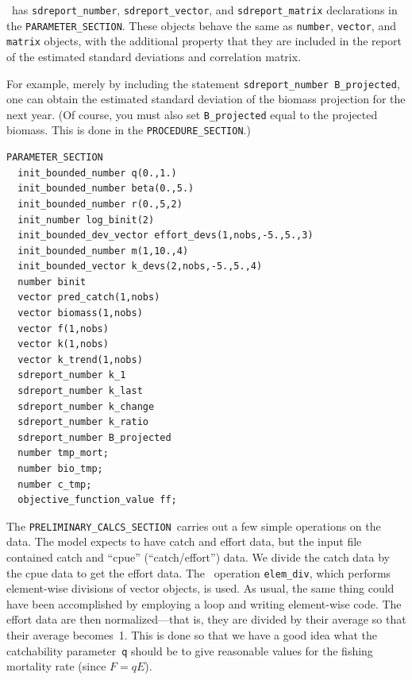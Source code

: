 \documentclass{admbmanual}
\newcommand\PS{\texttt{PARAMETER\_SECTION}}
\newcommand\PCS{\texttt{PRELIMINARY\_CALCS\_SECTION}}
\newcommand\PROS{\texttt{PROCEDURE\_SECTION}}
\begin{document}
\ADM\ has \texttt{sdreport\_number}, \texttt{sdreport\_vector},
and \texttt{sdreport\_matrix} declarations in the \PS.
 These objects behave the same as 
\texttt{number}, \texttt{vector}, and \texttt{matrix} objects,
with the additional property that they
are included in the report of the estimated standard
deviations and correlation matrix.

For example, merely by including the
statement \texttt{sdreport\_number B\_projected},
one can obtain the estimated standard deviation of
the biomass projection for the next year. 
(Of course, you must also set \texttt{B\_projected}
equal to the projected biomass. This is done in the \PROS.)
\begin{lstlisting}
PARAMETER_SECTION
  init_bounded_number q(0.,1.)
  init_bounded_number beta(0.,5.)
  init_bounded_number r(0.,5,2)
  init_number log_binit(2)
  init_bounded_dev_vector effort_devs(1,nobs,-5.,5.,3)
  init_bounded_number m(1,10.,4)
  init_bounded_vector k_devs(2,nobs,-5.,5.,4)
  number binit
  vector pred_catch(1,nobs)
  vector biomass(1,nobs)
  vector f(1,nobs)
  vector k(1,nobs)
  vector k_trend(1,nobs)
  sdreport_number k_1
  sdreport_number k_last
  sdreport_number k_change
  sdreport_number k_ratio
  sdreport_number B_projected
  number tmp_mort;
  number bio_tmp;
  number c_tmp;
  objective_function_value ff;
\end{lstlisting}

The \PCS\ carries out a few simple operations on the data.
The model expects to have catch and effort data, but the input
file contained catch and ``cpue'' (``catch/effort'') data.
We divide the catch data by the cpue data to get the effort
data. The \scAD\ operation \texttt{elem\_div}, which performs
element-wise divisions of vector objects, is used.
As usual, the same thing could have been accomplished
by employing a loop and writing element-wise code. 
The effort data are then normalized---that is, they are divided by
their average so that their average becomes~1. This is done so that
we have a good idea what the catchability parameter~\texttt{q}
should be to give reasonable values for the fishing mortality
rate (since $F=qE$). 
\end{document}
